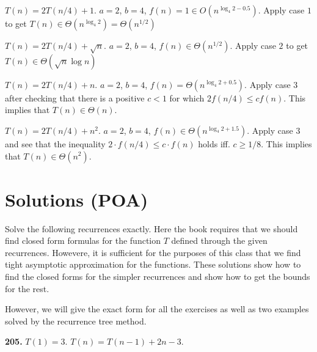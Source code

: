 \documentclass{article}
\renewcommand{\leq}{\leqslant}
\renewcommand{\geq}{\geqslant}
\begin{document}
\begin{description} \itemsep8pt
	\item $T(n) = 2T(n/4) + 1$. $a = 2$, $b=4$, $f(n) = 1 \in O(n^{\log_4 2 - 0.5})$. Apply case $1$ to get $T(n) \in \Theta(n^{\log_4{2}}) = \Theta(n^{1/2})$

	\item $T(n) = 2T(n/4) + \sqrt{n}$. $a=2$, $b=4$, $f(n) \in \Theta(n^{1/2})$. Apply case $2$ to get $T(n) \in \Theta(\sqrt{n}\log{n})$

	\item $T(n) = 2T(n/4) + n$. $a = 2$, $b=4$, $f(n) = \Theta(n^{\log_4 2 + 0.5})$. Apply case $3$ after checking that there is a positive $c < 1$ for which $2f(n/4) \leq cf(n)$. This implies that $T(n) \in \Theta(n)$.

	\item $T(n) = 2T(n/4) + n^2$. $a=2$, $b=4$, $f(n) \in \Theta(n^{\log_4 2 + 1.5})$. Apply case $3$ and see that the inequality $2 \cdot f(n/4) \leq c \cdot f(n)$ holds iff. $c \geq 1/8$. This implies that $T(n) \in \Theta(n^2)$.

\end{description}


\section*{Solutions (POA)}
Solve the following recurrences exactly. Here the book requires that we should find closed form formulas for the function $T$ defined through the given recurrences. Howevere, it is sufficient for the purposes of this class that we find tight asymptotic approximation for the functions. These solutions show how to find the closed forms for the simpler recurrences and show how to get the bounds for the rest.

However, we will give the exact form for all the exercises as well as two examples solved by the recurrence tree method.

\noindent\textbf{205.} $T(1) = 3$. $T(n) = T(n - 1) + 2n - 3$.
\end{document}
